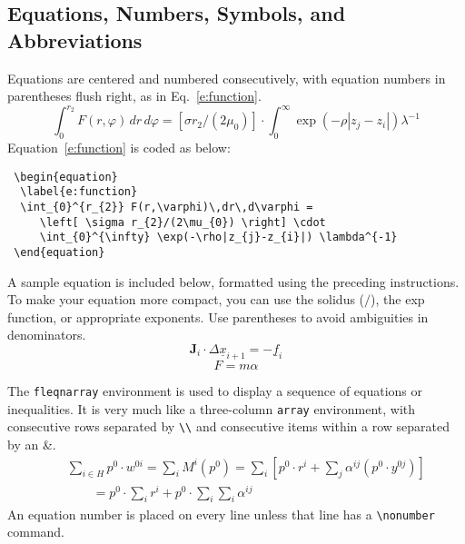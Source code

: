 \subsection{Equations, Numbers, Symbols, and Abbreviations}

Equations are centered and numbered consecutively, with equation
numbers in parentheses flush right, as in Eq.~\ref{e:function}.
\begin{equation}
 \label{e:function}
 \int_{0}^{r_{2}} F(r,\varphi)\,dr\,d\varphi =
    \left[ \sigma r_{2}/(2\mu_{0}) \right] \cdot
    \int_{0}^{\infty} \exp(-\rho|z_{j}-z_{i}|) \lambda^{-1} 
\end{equation}
Equation~\ref{e:function} is coded as below:
\begin{Verbatim}
 \begin{equation}
  \label{e:function}
  \int_{0}^{r_{2}} F(r,\varphi)\,dr\,d\varphi =
     \left[ \sigma r_{2}/(2\mu_{0}) \right] \cdot
     \int_{0}^{\infty} \exp(-\rho|z_{j}-z_{i}|) \lambda^{-1}
 \end{equation}
\end{Verbatim}
A sample equation is included below, formatted using the preceding
instructions.
To make your equation more compact, you can use the solidus ($/$), the
exp function, or appropriate exponents.
Use parentheses to avoid ambiguities in denominators.
\begin{equation}
  \label{e:displace}
  \mathbf{J}_i\cdot\Delta\underline{x}_{i+1}=-\underline{f}_i
\end{equation}
\begin{equation}
  \label{e:newton}
  F=m\alpha
\end{equation}

The \verb|fleqnarray| environment is used to display a sequence of
equations or inequalities. It is very much like a three-column
\verb|array| environment, with consecutive rows separated by
\verb|\\| and consecutive items within a row separated by an \&.
\begin{eqnarray}
&&\sum_{i\in H} p^0\cdot w^{0i}=\sum_i M^i (p^0) =
  \sum_i\left[p^0\cdot r^i + \sum_j \alpha^{ij} (p^0\cdot
  y^{0j})\right]\nonumber\\
&&{\qquad}= p^0 \cdot \sum_i r^i + p^0 \cdot \sum_i
\sum_i \alpha^{ij}
\end{eqnarray}
An equation number is placed on every line unless that line has a
\verb|\nonumber| command.

